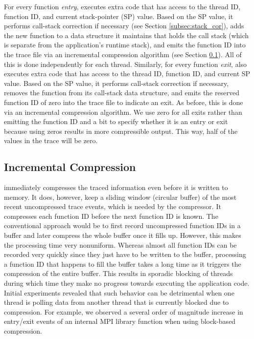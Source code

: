 For every function \emph{entry}, \parlot executes extra code that has access to the thread ID, function ID, and current stack-pointer (SP) value. Based on the SP value, it performs call-stack correction if necessary (see Section \ref{subsec:stack_cor}), adds the new function to a data structure it maintains that holds the call stack (which is separate from the application's runtime stack), and emits the function ID into the trace file via an incremental compression algorithm (see Section \ref{subsec:incr-compr}). All of this is done independently for each thread. Similarly, for every function \emph{exit}, \parlot also executes extra code that has access to the thread ID, function ID, and current SP value. Based on the SP value, it performs call-stack correction if necessary, removes the function from its call-stack data structure, and emits the reserved function ID of zero into the trace file to indicate an exit. As before, this is done via an incremental compression algorithm. We use zero for all exits rather than emitting the function ID and a bit to specify whether it is an entry or exit because using zeros results in more compressible output. This way, half of the values in the trace will be zero.





\subsection{Incremental Compression}
\label{subsec:incr-compr}

\parlot immediately compresses the traced information even before it is written to memory. It does, however, keep a sliding window (circular buffer) of the most recent uncompressed trace events, which is needed by the compressor. It compresses each function ID before the next function ID is known. The conventional approach would be to first record uncompressed function IDs in a buffer and later compress the whole buffer once it fills up. However, this makes the processing time very nonuniform. Whereas almost all function IDs can be recorded very quickly since they just have to be written to the buffer, processing a function ID that happens to fill the buffer takes a long time as it triggers the compression of the entire buffer. This results in sporadic blocking of threads during which time they make no progress towards executing the application code. Initial experiments revealed that such behavior can be detrimental when one thread is polling data from another thread that is currently blocked due to compression. For example, we observed a several order of magnitude increase in entry/exit events of an internal MPI library function when using block-based compression.

